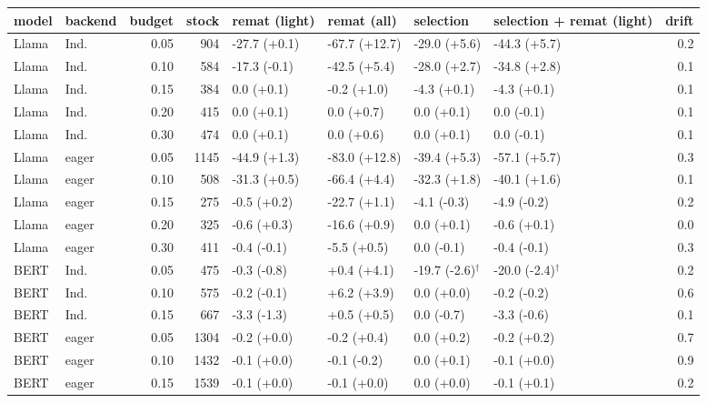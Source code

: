 \begin{tabular}{llrr llll r}
\toprule
model & backend & budget & stock & remat (light) & remat (all) & selection & selection + remat (light) & drift \\
\midrule
Llama & Ind. & 0.05 & 904 & -27.7 (+0.1) & -67.7 (+12.7) & -29.0 (+5.6) & -44.3 (+5.7) & 0.2 \\
Llama & Ind. & 0.10 & 584 & -17.3 (-0.1) & -42.5 (+5.4) & -28.0 (+2.7) & -34.8 (+2.8) & 0.1 \\
Llama & Ind. & 0.15 & 384 & 0.0 (+0.1) & -0.2 (+1.0) & -4.3 (+0.1) & -4.3 (+0.1) & 0.1 \\
Llama & Ind. & 0.20 & 415 & 0.0 (+0.1) & 0.0 (+0.7) & 0.0 (+0.1) & 0.0 (-0.1) & 0.1 \\
Llama & Ind. & 0.30 & 474 & 0.0 (+0.1) & 0.0 (+0.6) & 0.0 (+0.1) & 0.0 (-0.1) & 0.1 \\
\midrule
Llama & eager & 0.05 & 1145 & -44.9 (+1.3) & -83.0 (+12.8) & -39.4 (+5.3) & -57.1 (+5.7) & 0.3 \\
Llama & eager & 0.10 & 508 & -31.3 (+0.5) & -66.4 (+4.4) & -32.3 (+1.8) & -40.1 (+1.6) & 0.1 \\
Llama & eager & 0.15 & 275 & -0.5 (+0.2) & -22.7 (+1.1) & -4.1 (-0.3) & -4.9 (-0.2) & 0.2 \\
Llama & eager & 0.20 & 325 & -0.6 (+0.3) & -16.6 (+0.9) & 0.0 (+0.1) & -0.6 (+0.1) & 0.0 \\
Llama & eager & 0.30 & 411 & -0.4 (-0.1) & -5.5 (+0.5) & 0.0 (-0.1) & -0.4 (-0.1) & 0.3 \\
\midrule
BERT & Ind. & 0.05 & 475 & -0.3 (-0.8) & +0.4 (+4.1) & -19.7 (-2.6)$^\dagger$ & -20.0 (-2.4)$^\dagger$ & 0.2 \\
BERT & Ind. & 0.10 & 575 & -0.2 (-0.1) & +6.2 (+3.9) & 0.0 (+0.0) & -0.2 (-0.2) & 0.6 \\
BERT & Ind. & 0.15 & 667 & -3.3 (-1.3) & +0.5 (+0.5) & 0.0 (-0.7) & -3.3 (-0.6) & 0.1 \\
\midrule
BERT & eager & 0.05 & 1304 & -0.2 (+0.0) & -0.2 (+0.4) & 0.0 (+0.2) & -0.2 (+0.2) & 0.7 \\
BERT & eager & 0.10 & 1432 & -0.1 (+0.0) & -0.1 (-0.2) & 0.0 (+0.1) & -0.1 (+0.0) & 0.9 \\
BERT & eager & 0.15 & 1539 & -0.1 (+0.0) & -0.1 (+0.0) & 0.0 (+0.0) & -0.1 (+0.1) & 0.2 \\
\bottomrule
\end{tabular}
